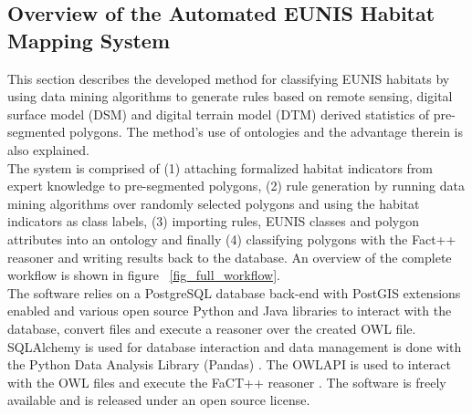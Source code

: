 \documentclass[authoryear, review,12pt,number]{elsarticle}
\begin{document}
\subsection{Overview of the Automated EUNIS Habitat Mapping System}
This section describes the developed method for classifying EUNIS habitats by
using data mining algorithms to generate rules based on remote sensing, digital
surface model (DSM) and digital terrain model (DTM) derived statistics of
pre-segmented polygons. The method's use of ontologies and the advantage
therein is also explained.\\
The system is comprised of (1) attaching
formalized habitat indicators from expert knowledge to pre-segmented polygons,
(2) rule generation by running data mining algorithms over randomly selected
polygons and using the habitat indicators as class labels, (3) importing rules,
EUNIS classes and polygon attributes into an ontology and finally (4)
classifying polygons with the Fact++ reasoner \citep{Tsarkov2006} and writing
results back to the database. An overview of the complete workflow is shown in
figure ~\ref{fig_full_workflow}.\\
The software relies on a PostgreSQL database back-end with PostGIS extensions
enabled and various open source Python and Java libraries to interact with the
database, convert files and execute a reasoner over the created OWL file.
SQLAlchemy is used for database interaction and data management is done with
the Python Data Analysis Library (Pandas) \citep{McKinney2010}. The OWLAPI is
used to interact with the OWL files and execute the FaCT++ reasoner
\citep{Tsarkov2006}. The software is freely available and is released under an
open source license. 
\end{document}
